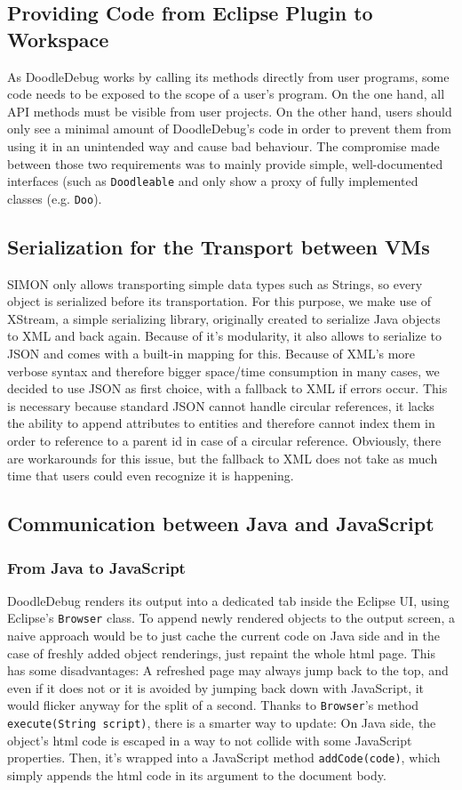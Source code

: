 \documentclass[english]{acm_proc_article-sp}
\newcommand\meta[1]{\nbc{META}{#1}{purple}}
\begin{document}
\subsection{Providing Code from Eclipse Plugin to Workspace}
\meta{Appendix?}
As DoodleDebug works by calling its methods directly from user programs, some code needs to be exposed to the scope of a user's program. On the one hand, all API methods must be visible from user projects. On the other hand, users should only see a minimal amount of DoodleDebug's code in order to prevent them from using it in an unintended way and cause bad behaviour. The compromise made between those two requirements was to mainly provide simple, well-documented interfaces (such as \verb-Doodleable- and only show a proxy of fully implemented classes (e.g. \verb-Doo-).

\subsection{Serialization for the Transport between VMs}
SIMON only allows transporting simple data types such as Strings, so every object is serialized before its transportation. For this purpose, we make use of XStream\cite{xstream}, a simple serializing library, originally created to serialize Java objects to XML and back again. Because of it's modularity, it also allows to serialize to JSON and comes with a built-in mapping for this. Because of XML's more verbose syntax and therefore bigger space/time consumption in many cases, we decided to use JSON as first choice, with a fallback to XML if errors occur. This is necessary because standard JSON cannot handle circular references, it lacks the ability to append attributes to entities and therefore cannot index them in order to reference to a parent id in case of a circular reference. Obviously, there are workarounds for this issue, but the fallback to XML does not take as much time that users could even recognize it is happening.

\subsection{Communication between Java and JavaScript}
\subsubsection{From Java to JavaScript}
DoodleDebug renders its output into a dedicated tab inside the Eclipse UI, using Eclipse's \verb.Browser. class. To append newly rendered objects to the output screen, a naive approach would be to just cache the current code on Java side and in the case of freshly added object renderings, just repaint the whole html page. This has some disadvantages: A refreshed page may always jump back to the top, and even if it does not or it is avoided by jumping back down with JavaScript, it would flicker anyway for the split of a second. Thanks to \verb.Browser.'s method \verb.execute(String script)., there is a smarter way to update: On Java side, the object's html code is escaped in a way to not collide with some JavaScript properties. Then, it's wrapped into a JavaScript method \verb.addCode(code)., which simply appends the html code in its argument to the document body.
\end{document}
